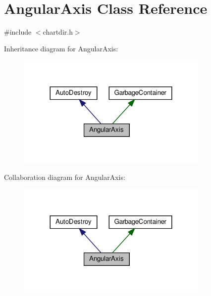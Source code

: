 \hypertarget{class_angular_axis}{}\section{Angular\+Axis Class Reference}
\label{class_angular_axis}


{\ttfamily \#include $<$chartdir.\+h$>$}



Inheritance diagram for Angular\+Axis\+:
\nopagebreak
\begin{figure}[H]
\begin{center}
\leavevmode
\includegraphics[width=264pt]{class_angular_axis__inherit__graph}
\end{center}
\end{figure}


Collaboration diagram for Angular\+Axis\+:
\nopagebreak
\begin{figure}[H]
\begin{center}
\leavevmode
\includegraphics[width=264pt]{class_angular_axis__coll__graph}
\end{center}
\end{figure}
